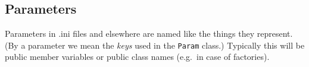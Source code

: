 \documentclass[a4]{article}
\begin{document}
\subsection{Parameters}

Parameters in .ini files and elsewhere are named like the things they
represent.  (By a parameter we mean the \emph{keys} used in the \texttt{Param}
class.)  Typically this will be public member variables or public class names
(e.g.\ in case of factories).


\end{document}
